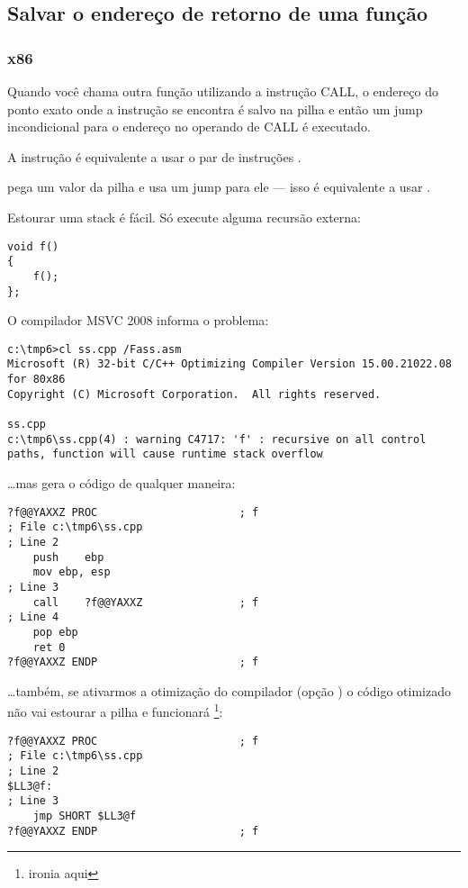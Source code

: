 \subsection{Salvar o endereço de retorno de uma função}

\subsubsection{x86}

Quando você chama outra função utilizando a instrução CALL, o endereço do ponto exato onde a 
instrução \CALL se encontra é salvo na pilha e então um jump incondicional para o endereço no operando de CALL é executado.

A instrução \CALL é equivalente a usar o par de instruções .

\RET pega um valor da pilha e usa um jump para ele --- isso é equivalente a usar .

\index{\Recursion}
Estourar uma stack é fácil. Só execute alguma recursão externa:

\begin{lstlisting}
void f()
{
	f();
};
\end{lstlisting}

O compilador MSVC 2008 informa o problema:

\begin{lstlisting}
c:\tmp6>cl ss.cpp /Fass.asm
Microsoft (R) 32-bit C/C++ Optimizing Compiler Version 15.00.21022.08 for 80x86
Copyright (C) Microsoft Corporation.  All rights reserved.

ss.cpp
c:\tmp6\ss.cpp(4) : warning C4717: 'f' : recursive on all control paths, function will cause runtime stack overflow
\end{lstlisting}

\dots mas gera o código de qualquer maneira:

\begin{lstlisting}
?f@@YAXXZ PROC						; f
; File c:\tmp6\ss.cpp
; Line 2
	push	ebp
	mov	ebp, esp
; Line 3
	call	?f@@YAXXZ				; f
; Line 4
	pop	ebp
	ret	0
?f@@YAXXZ ENDP						; f
\end{lstlisting}

\dots também, se ativarmos a otimização do compilador (opção ) 
o código otimizado não vai estourar a pilha e funcionará  \footnote{ironia aqui}:

\begin{lstlisting}
?f@@YAXXZ PROC						; f
; File c:\tmp6\ss.cpp
; Line 2
$LL3@f:
; Line 3
	jmp	SHORT $LL3@f
?f@@YAXXZ ENDP						; f
\end{lstlisting}

\PTBRph{}

